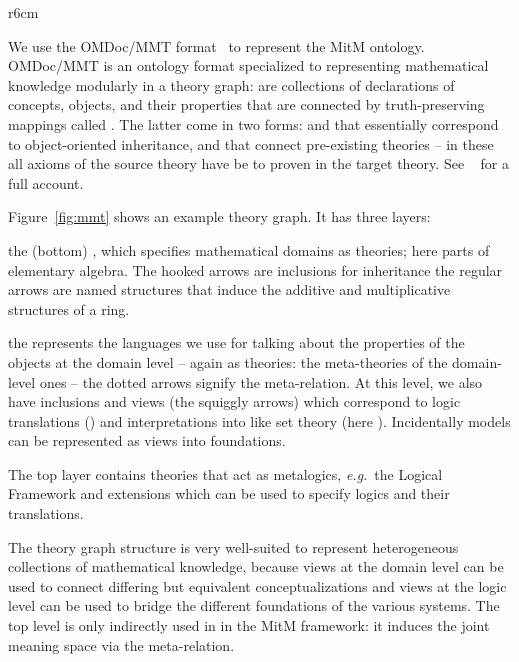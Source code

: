 \begin{wrapfigure}r{6cm}\centering\vspace*{-2em}
  \vspace*{-.5em}
  \caption{OMDoc/MMT Theory Graphs}\label{fig:mmt}\vspace*{-1em}
\end{wrapfigure}
We use the OMDoc/MMT format~\cite{Kohlhase:OMDoc1.2,MMTSVN:on} to represent the MitM
ontology. OMDoc/MMT is an ontology format specialized to representing mathematical
knowledge modularly in a theory graph:  are collections of declarations
of concepts, objects, and their properties that are connected by truth-preserving mappings
called . The latter come in two forms:  and
 that essentially correspond to object-oriented inheritance, and
 that connect pre-existing theories -- in these all axioms of the source
theory have be to proven in the target theory. See ~\cite{RabKoh:WSMSML13} for a full
account. 

Figure~\ref{fig:mmt} shows an example theory graph. It has three layers:
\begin{compactenum}[\em i\rm)]
\item the (bottom) , which specifies mathematical domains as theories; here
  parts of elementary algebra. The hooked arrows are inclusions for inheritance the
  regular arrows are named structures that induce the additive and multiplicative
  structures of a ring.
\item the  represents the languages we use for talking about the
  properties of the objects at the domain level -- again as theories: the meta-theories of
  the domain-level ones -- the dotted arrows signify the meta-relation. At this level, we
  also have inclusions and views (the squiggly arrows) which correspond to logic
  translations () and interpretations into  like
  set theory (here ). Incidentally models can be represented as views into
  foundations.
\item The top layer contains theories that act as metalogics, \emph{e.g.}\ the Logical Framework
   and extensions which can be used to specify logics and their translations.
\end{compactenum}
The theory graph structure is very well-suited to represent heterogeneous collections of
mathematical knowledge, because views at the domain level can be used to connect differing
but equivalent conceptualizations and views at the logic level can be used to bridge the
different foundations of the various systems. The top level is only indirectly used in in
the MitM framework: it induces the joint meaning space via the meta-relation.


